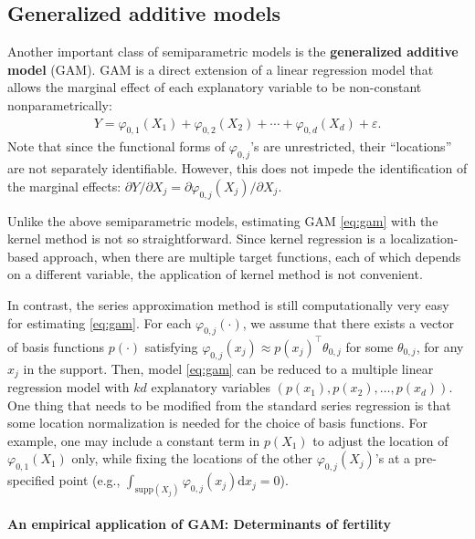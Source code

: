 \documentclass[10.5pt, A4paper, openany, uplatex]{book}
\newcommand{\eps}{\varepsilon}
\numberwithin{equation}{section}
\begin{document}
\subsection{Generalized additive models}

Another important class of semiparametric models is the \textbf{generalized additive model} (GAM).
GAM is a direct extension of a linear regression model that allows the marginal effect of each explanatory variable to be non-constant nonparametrically:
\begin{align}\label{eq:gam}
	Y = \varphi_{0,1}(X_1) + \varphi_{0,2}(X_2) + \cdots + \varphi_{0,d}(X_d) + \eps.
\end{align}
Note that since the functional forms of $\varphi_{0,j}$'s are unrestricted, their ``locations'' are not separately identifiable.
However, this does not impede the identification of the marginal effects: $\partial Y/ \partial X_j = \partial \varphi_{0,j}(X_j) / \partial X_j$. 

Unlike the above semiparametric models, estimating GAM \eqref{eq:gam} with the kernel method is not so straightforward.
Since kernel regression is a localization-based approach, when there are multiple target functions, each of which depends on a different variable, the application of kernel method is not convenient.

In contrast, the series approximation method is still computationally very easy for estimating \eqref{eq:gam}.
For each $\varphi_{0,j}(\cdot)$, we assume that there exists a vector of basis functions $p(\cdot)$ satisfying $\varphi_{0,j}(x_j) \approx p(x_j)^\top \theta_{0,j}$ for some $\theta_{0,j}$, for any $x_j$ in the support.
Then, model \eqref{eq:gam} can be reduced to a multiple linear regression model with $kd$ explanatory variables $(p(x_1), p(x_2), \ldots, p(x_d))$.
One thing that needs to be modified from the standard series regression is that some location normalization is needed for the choice of basis functions.
For example, one may include a constant term in $p(X_1)$ to adjust the location of $\varphi_{0,1}(X_1)$ only, while fixing the locations of the other $\varphi_{0,j}(X_j)$'s at a pre-specified point (e.g., $\int_{\text{supp}(X_j)}\varphi_{0,j}(x_j) \text{d}x_j = 0$).

\paragraph*{An empirical application of GAM: Determinants of fertility}
\end{document}
